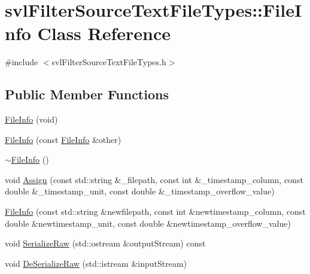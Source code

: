 \hypertarget{classsvl_filter_source_text_file_types_1_1_file_info}{}\section{svl\+Filter\+Source\+Text\+File\+Types\+:\+:File\+Info Class Reference}
\label{classsvl_filter_source_text_file_types_1_1_file_info}


{\ttfamily \#include $<$svl\+Filter\+Source\+Text\+File\+Types.\+h$>$}

\subsection*{Public Member Functions}
\begin{DoxyCompactItemize}
\item 
\hyperlink{classsvl_filter_source_text_file_types_1_1_file_info_aee7fde8e1afcd0c9c2a6d3d876fcf590}{File\+Info} (void)
\item 
\hyperlink{classsvl_filter_source_text_file_types_1_1_file_info_a563aa39fc54dfa562b92b0a61b5634de}{File\+Info} (const \hyperlink{classsvl_filter_source_text_file_types_1_1_file_info}{File\+Info} \&other)
\item 
\hyperlink{classsvl_filter_source_text_file_types_1_1_file_info_ad7d9a3cadb8c4406295fc5094b2de766}{$\sim$\+File\+Info} ()
\item 
void \hyperlink{classsvl_filter_source_text_file_types_1_1_file_info_a49ea28f91a70e9d2062418ae970a935a}{Assign} (const std\+::string \&\+\_\+filepath, const int \&\+\_\+timestamp\+\_\+column, const double \&\+\_\+timestamp\+\_\+unit, const double \&\+\_\+timestamp\+\_\+overflow\+\_\+value)
\item 
\hyperlink{classsvl_filter_source_text_file_types_1_1_file_info_a1a157ed38fdd60d7c7bf7c550f638a92}{File\+Info} (const std\+::string \&newfilepath, const int \&newtimestamp\+\_\+column, const double \&newtimestamp\+\_\+unit, const double \&newtimestamp\+\_\+overflow\+\_\+value)
\item 
void \hyperlink{classsvl_filter_source_text_file_types_1_1_file_info_ab55fc1154f5a0026365614afae92bede}{Serialize\+Raw} (std\+::ostream \&output\+Stream) const 
\item 
void \hyperlink{classsvl_filter_source_text_file_types_1_1_file_info_ac78d84dc03fec64461d98f23b37c5fe5}{De\+Serialize\+Raw} (std\+::istream \&input\+Stream)
\item 

\end{DoxyCompactItemize}
